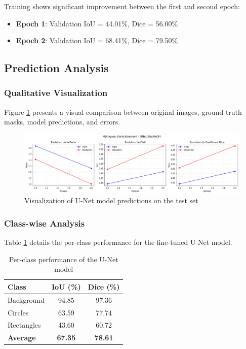 \documentclass[12pt,a4paper]{article}
\begin{document}
Training shows significant improvement between the first and second epoch:
\begin{itemize}
    \item \textbf{Epoch 1}: Validation IoU = 44.01\%, Dice = 56.00\%
    \item \textbf{Epoch 2}: Validation IoU = 68.41\%, Dice = 79.50\%
\end{itemize}

\subsection{Prediction Analysis}

\subsubsection{Qualitative Visualization}

Figure \ref{fig:predictions_visualization} presents a visual comparison between original images, ground truth masks, model predictions, and errors.

\begin{figure}[H]
    \centering
    \includegraphics[width=\textwidth]{img_tp1/cell_17_output_02_image_07.png}
    \caption{Visualization of U-Net model predictions on the test set}
    \label{fig:predictions_visualization}
\end{figure}

\subsubsection{Class-wise Analysis}

Table \ref{tab:class_performance} details the per-class performance for the fine-tuned U-Net model.

\begin{table}[H]
\centering
\caption{Per-class performance of the U-Net model}
\label{tab:class_performance}
\begin{tabular}{@{}lcc@{}}
\toprule
\textbf{Class} & \textbf{IoU (\%)} & \textbf{Dice (\%)} \\
\midrule
Background & 94.85 & 97.36 \\
Circles & 63.59 & 77.74 \\
Rectangles & 43.60 & 60.72 \\
\midrule
\textbf{Average} & \textbf{67.35} & \textbf{78.61} \\
\bottomrule
\end{tabular}
\end{table}
\end{document}
